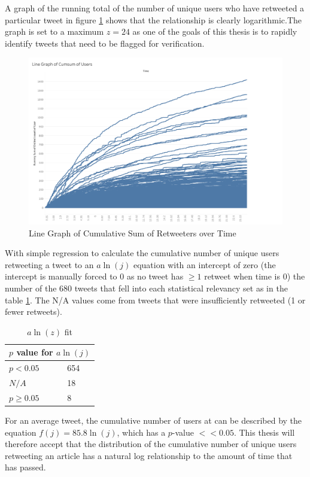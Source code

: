 \documentclass[preprint,review,12pt]{elsarticle}
\begin{document}
 
A graph of the running total of the number of unique users who have retweeted a particular tweet in figure \ref{fig:Users CumSum/Time} shows that the relationship is clearly logarithmic.The graph is set to a maximum $z = 24$ as one of the goals of this thesis is to rapidly identify tweets that need to be flagged for verification.
\begin{figure}[h!]
 \centering
  \includegraphics[width=12cm]{Linegraph cumsum users.png}
  \caption{Line Graph of Cumulative Sum of Retweeters over Time}\label{fig:Users CumSum/Time}
 \end{figure}

With simple regression to calculate the cumulative number of unique users retweeting a tweet to an $a\ln(j)$ equation with an intercept of zero (the intercept is manually forced to 0 as no tweet has $\geq 1$ retweet when time is 0) the number of the 680 tweets that fell into each statistical relevancy set as in the table \ref{Natural Log Fit}. The N/A values come from tweets that were insufficiently retweeted (1 or fewer retweets).   
\begin{table}[h!]
\centering
\begin{tabular}{ |p{3cm}|p{3cm}|  }
\hline
\multicolumn{2}{|c|}{$p$ value for $a\ln(j)$} \\
\hline
$p < 0.05$  & 654\\
$N/A$ & 18 \\
$ p \geq 0.05$ & 8 \\
\hline
\end{tabular}
\caption{$a\ln(z)$ fit}
\label{Natural Log Fit}
\end{table}

For an average tweet, the cumulative number of users at can be described by the equation $f(j)=85.8\ln(j)$, which has a $p$-value $<< 0.05$. This thesis will therefore accept that the distribution of the cumulative number of unique users retweeting an article has a natural log relationship to the amount of time that has passed.
\end{document}
